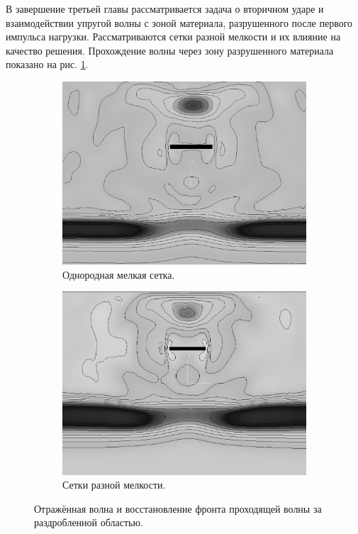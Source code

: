 В завершение третьей главы рассматривается задача о вторичном ударе и взаимодействии упругой волны с зоной материала, разрушенного после первого импульса нагрузки. Рассматриваются сетки разной мелкости и их влияние на качество решения. Прохождение волны через зону разрушенного материала показано на рис. \ref{pic:crack_final_front}.

\begin{figure}[htp]
\begin{subfigure}[b]{0.5\textwidth}
\centering
\includegraphics[width=\textwidth]{png/wave-around-crack/final-front-uniform-mesh.png}
\caption{Однородная мелкая сетка.}
\end{subfigure}
\begin{subfigure}[b]{0.5\textwidth}
\centering
\includegraphics[width=\textwidth]{png/wave-around-crack/final-front-non-uniform-mesh.png}
\caption{Сетки разной мелкости.}
\end{subfigure}
\caption{Отражённая волна и восстановление фронта проходящей волны за раздробленной областью.}
\label{pic:crack_final_front}
\end{figure}

